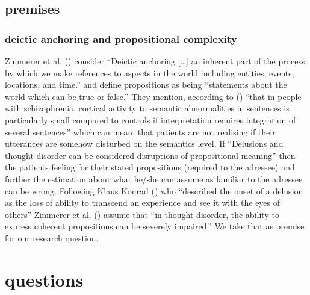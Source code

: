 \documentclass[
  12pt,
  oneside]{book}
\begin{document}
\subsection{premises}\label{premises}

\subsubsection{deictic anchoring and propositional complexity}\label{deictic-anchoring-and-propositional-complexity}

Zimmerer et al. () consider
``Deictic anchoring {[}\ldots{]} an inherent part of the process by which we make references to aspects in the world including entities, events, locations, and time.'' and define propositions as being ``statements about the world which can be true or false.'' They mention, according to () ``that in people with schizophrenia, cortical activity to semantic abnormalities in sentences is particularly small compared to controls if interpretation requires integration of several sentences'' which can mean, that patients are not realising if their utterances are somehow disturbed on the semantics level.
If ``Delusions and thought disorder can be considered disruptions of propositional meaning'' then the patients feeling for their stated propositions (required to the adressee) and further the estimation about what he/she can assume as familiar to the adressee can be wrong. Following Klaus Konrad () who ``described the onset of a delusion as the loss of ability to transcend an experience and see it with the eyes of others'' Zimmerer et al. () assume that ``in thought disorder, the ability to express coherent propositions can be severely impaired.'' We take that as premise for our research question.

\section{questions}\label{questions}
\end{document}
